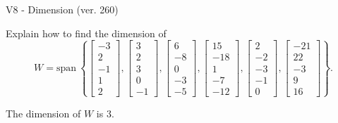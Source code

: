 \begin{exercise}
  \begin{exerciseTitle}V8 - Dimension (ver. 260)\end{exerciseTitle}
  \begin{exerciseStatement}
    Explain how to find the dimension of 
\[W=\mathrm{span}\ \left\{\left[\begin{array}{r}
-3 \\
2 \\
-1 \\
1 \\
2
\end{array}\right] , \left[\begin{array}{r}
3 \\
2 \\
3 \\
0 \\
-1
\end{array}\right] , \left[\begin{array}{r}
6 \\
-8 \\
0 \\
-3 \\
-5
\end{array}\right] , \left[\begin{array}{r}
15 \\
-18 \\
1 \\
-7 \\
-12
\end{array}\right] , \left[\begin{array}{r}
2 \\
-2 \\
-3 \\
-1 \\
0
\end{array}\right] , \left[\begin{array}{r}
-21 \\
22 \\
-3 \\
9 \\
16
\end{array}\right]\right\}.\]



  \end{exerciseStatement}
  \begin{exerciseAnswer}
   The dimension of \(W\) is  \(3\).
  


  \end{exerciseAnswer}
\end{exercise}